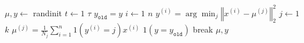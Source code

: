 \documentclass[10pt,oneside]{book}
\begin{document}
\pagestyle{empty}
\thispagestyle{empty}

\begin{codebox}
  \li $\mu, y \gets $ randinit
  \li \For $t \gets 1$ \To $\tau$
  \li   \Do
         $y_{\texttt{old}} = y$
  \li        \For $i \gets 1$ \To $n$
  \li       \Do
             $y^{(i)} = \arg\min_j \left\Vert x^{(i)} - \mu^{(j)} \right\Vert_2^2$
            \End
  \li    \For $j \gets 1$ \To $k$
  \li       \Do 
             $\mu^{(j)} = \frac{1}{N_j} \sum_{i=1}^n 1(y^{(i)} = j) x^{(i)}$
            \End
  \li      \If $1(y = y_{\texttt{old}})$
  \li          \Then
		  break \label{alg:termination}
      \End
      \End
  \li \Return $\mu, y$
\end{codebox}
\end{document}
